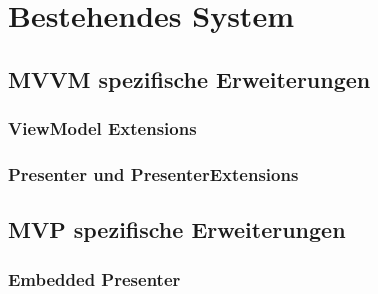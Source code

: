 \chapter{Bestehendes System}
\label{cha:basis}

\section{MVVM spezifische Erweiterungen}
\label{sec:mvvm_extensions}

\subsection{ViewModel Extensions}
\label{subsec:viewmodel_extensions}

\subsection{Presenter und PresenterExtensions}
\label{subsec:presenter_extensions}

\section{MVP spezifische Erweiterungen}
\label{sec:mvp_extensions}

\subsection{Embedded Presenter}
\label{subsec:embedded_presenter}